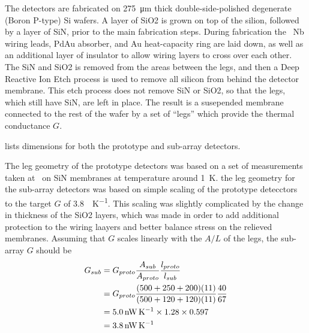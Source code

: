 The detectors are fabricated on \SI{275}{\um} thick double-side-polished degenerate (Boron P-type) Si wafers.
A layer of SiO2 is grown on top of the silion, followed by a layer of SiN, prior to the main fabrication steps.
During fabrication the \TES\, Nb wiring leads, PdAu absorber, and Au heat-capacity ring are laid down, as well as an additional layer of insulator to allow wiring layers to cross over each other.
The SiN and SiO2 is removed from the areas between the legs, and then a Deep Reactive Ion Etch process is used to remove all silicon from behind the detector membrane.
This etch process does not remove SiN or SiO2, so that the legs, which still have SiN, are left in place.
The result is a susepended membrane connected to the rest of the wafer by a set of ``legs'' which provide the thermal conductance $G$.

 lists dimensions for both the prototype and sub-array detectors.

The leg geometry of the prototype detectors was based on a set of measurements taken at \NIST\ on SiN membranes at temperature around \SI{1}{\K}.
the leg geometry for the sub-array detectors was based on simple scaling of the prototype detecctors to the target $G$ of \SI{3.8}{\nW\per\K}.
This scaling was slightly complicated by the change in thickness of the SiO2 layers, which was made in order to add additional protection to the wiring laayers and better balance stress on the relieved membranes.
Assuming that $G$ scales linearly with the $A/L$ of the legs, the sub-array $G$ should be
\begin{align}
  G_{sub} & = G_{proto} \frac{A_{sub}}{A_{proto}} \frac{l_{proto}}{l_{sub}} \\
         & = G_{proto} \frac{(500 + 250 + 200)(11)}{(500 + 120 + 120)(11)} \frac{40}{67} \\
         & = \SI{5.0}{\nW\per\K} \times 1.28 \times 0.597 \\
         & = \SI{3.8}{\nW\per\K} 
\end{align}

